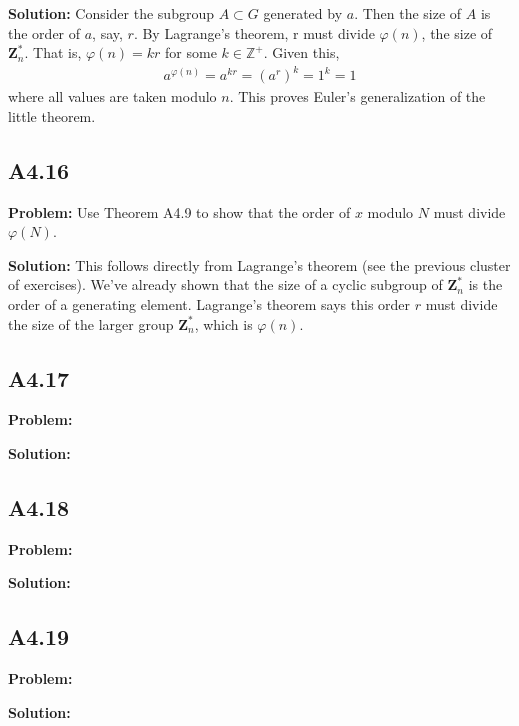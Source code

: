 \documentclass{article}
\begin{document}
\textbf{Solution:} Consider the subgroup $A\subset G$ generated by $a$. Then the size of $A$ is the order of $a$, say, $r$. By Lagrange's theorem, r must divide $\varphi(n)$, the size of $\textbf{Z}_n^*$. That is, $\varphi(n) = k r$ for some $k\in\mathbb{Z}^+$. Given this,
\begin{align}
    a^{\varphi(n)} = a^{kr} = (a^r)^k = 1^k = 1
\end{align}
where all values are taken modulo $n$. This proves Euler's generalization of the little theorem.

\subsection*{A4.16}
\textbf{Problem:} Use Theorem A4.9 to show that the order of $x$ modulo $N$ must divide $\varphi(N)$.

\textbf{Solution:} This follows directly from Lagrange's theorem (see the previous cluster of exercises). We've already shown that the size of a cyclic subgroup of $\textbf{Z}_n^*$ is the order of a generating element. Lagrange's theorem says this order $r$ must divide the size of the larger group $\textbf{Z}_n^*$, which is $\varphi(n)$.

\subsection*{A4.17}
\textbf{Problem:} 

\textbf{Solution:}

\subsection*{A4.18}
\textbf{Problem:} 

\textbf{Solution:}

\subsection*{A4.19}
\textbf{Problem:} 

\textbf{Solution:}
\end{document}
